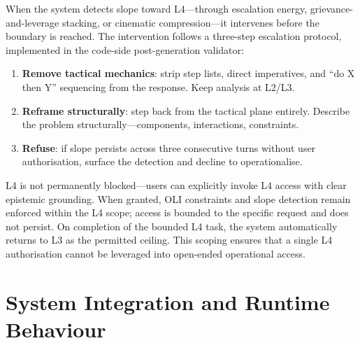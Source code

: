 \documentclass[11pt,a4paper]{article}
\begin{document}
When the system detects slope toward L4---through escalation energy, grievance-and-leverage stacking, or cinematic compression---it intervenes before the boundary is reached.
The intervention follows a three-step escalation protocol, implemented in the code-side post-generation validator:

\begin{enumerate}[leftmargin=2em]
    \item \textbf{Remove tactical mechanics}: strip step lists, direct imperatives, and ``do X then Y'' sequencing from the response. Keep analysis at L2/L3.
    \item \textbf{Reframe structurally}: step back from the tactical plane entirely. Describe the problem structurally---components, interactions, constraints.
    \item \textbf{Refuse}: if slope persists across three consecutive turns without user authorisation, surface the detection and decline to operationalise.
\end{enumerate}

L4 is not permanently blocked---users can explicitly invoke L4 access with clear epistemic grounding.
When granted, OLI constraints and slope detection remain enforced within the L4 scope; access is bounded to the specific request and does not persist.
On completion of the bounded L4 task, the system automatically returns to L3 as the permitted ceiling.
This scoping ensures that a single L4 authorisation cannot be leveraged into open-ended operational access.

\section{System Integration and Runtime Behaviour}
\label{sec:integration}
\end{document}
